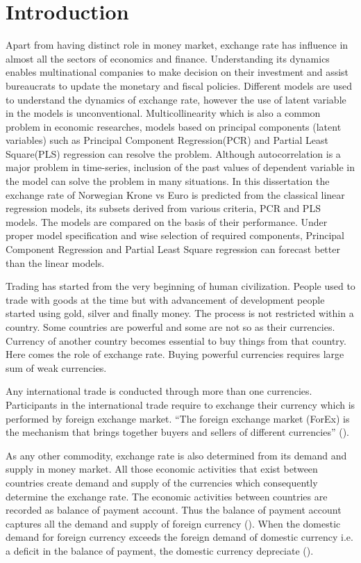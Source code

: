 \documentclass[12pt, lot, lof]{thesis}\usepackage[]{graphicx}\usepackage[]{color}
\begin{document}
\chapter{Introduction}
\label{ch:Introduction}
Apart from having distinct role in money market, exchange rate has influence in almost all the sectors of economics and finance. Understanding its dynamics enables multinational companies to make decision on their investment and assist bureaucrats to  update the monetary and fiscal policies. Different models are used to understand the dynamics of exchange rate, however the use of latent variable in the models is unconventional. Multicollinearity which is also a common problem in economic researches, models based on principal components (latent variables) such as Principal Component Regression(PCR) and Partial Least Square(PLS) regression can resolve the problem. Although autocorrelation is a major problem in time-series, inclusion of the past values of dependent variable in the model can solve the problem in many situations. In this dissertation the exchange rate of Norwegian Krone vs Euro is predicted from the classical linear regression models, its subsets derived from various criteria, PCR and PLS models. The models are compared on the basis of their performance. Under proper model specification and wise selection of required components, Principal Component Regression and Partial Least Square regression can forecast better than the linear models.

Trading has started from the very beginning of human civilization. People used to trade with goods at the time but with advancement of development people started using gold, silver and finally money. The process is not restricted within a country. Some countries are powerful and some are not so as their currencies. Currency of another country becomes essential to buy things from that country. Here comes the role of exchange rate. Buying powerful currencies requires large sum of weak currencies. 

Any international trade is conducted through more than one currencies. Participants in the international trade require to exchange their currency which is performed by foreign exchange market. ``The foreign exchange market (ForEx) is the mechanism that brings together buyers and sellers of different currencies'' (\cite{appleyard2014international}).

As any other commodity, exchange rate is also determined from its demand and supply in money market. All those economic activities that exist between countries create demand and supply of the currencies which consequently determine the exchange rate. The economic activities between countries are recorded as balance of payment account. Thus the balance of payment account captures all the demand and supply of foreign currency (\cite{fang1991forecasting}). When the domestic demand for foreign currency exceeds the foreign demand of domestic currency i.e. a deficit in the balance of payment, the domestic currency depreciate (\cite{sur2005}).
\end{document}
